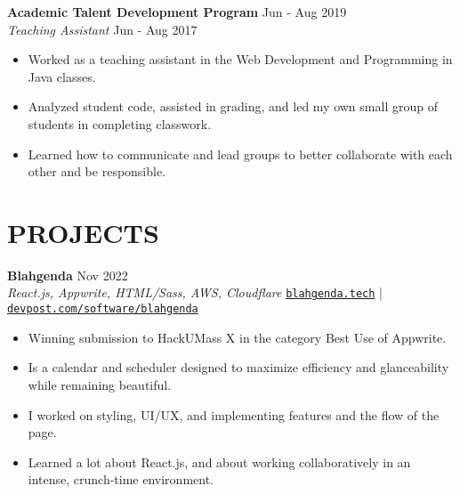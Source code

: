 \documentclass[letterpaper,10pt]{extarticle}
\begin{document}
\noindent
\textbf{Academic Talent Development Program} \hfill Jun - Aug 2019\\ %
\textit{Teaching Assistant} \hfill Jun - Aug 2017 %
\begin{itemize}
    \item Worked as a teaching assistant in the Web Development and Programming in Java classes.
    \item Analyzed student code, assisted in grading, and led my own small group of students in completing classwork.
    \item Learned how to communicate and lead groups to better collaborate with each other and be responsible.
\end{itemize}


\section*{PROJECTS}
\noindent
\textbf{Blahgenda} \hfill Nov 2022\\ %
\textit{React.js, Appwrite, HTML/Sass, AWS, Cloudflare} \hfill \texttt{\href{https://blahgenda.tech}{blahgenda.tech}} | \texttt{\href{https://devpost.com/software/blahgenda}{devpost.com/software/blahgenda}}
\begin{itemize}
    \item Winning submission to HackUMass X in the category Best Use of Appwrite.
    \item Is a calendar and scheduler designed to maximize efficiency and glanceability while remaining beautiful.
    \item I worked on styling, UI/UX, and implementing features and the flow of the page.
    \item Learned a lot about React.js, and about working collaboratively in an intense, crunch-time environment.
\end{itemize}
\end{document}

